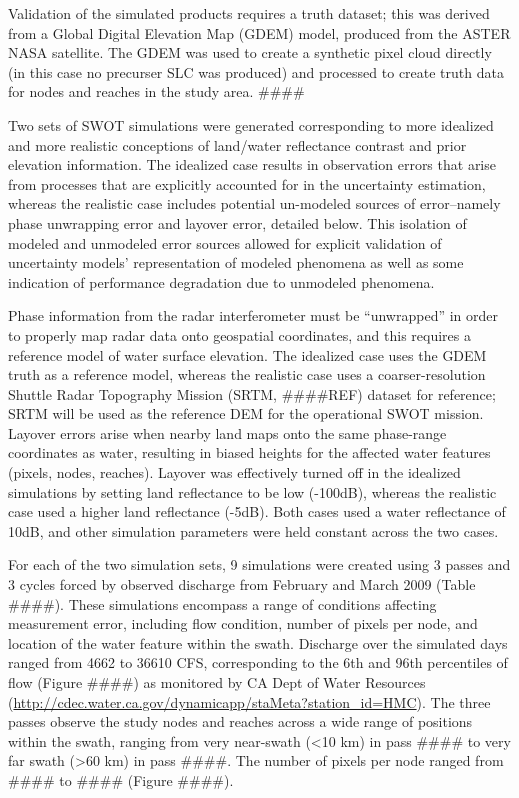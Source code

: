 \documentclass[]{book}
\begin{document}
Validation of the simulated products requires a truth dataset; this was derived from a Global Digital Elevation Map (GDEM) model, produced from the ASTER NASA satellite. The GDEM was used to create a synthetic pixel cloud directly (in this case no precurser SLC was produced) and processed to create truth data for nodes and reaches in the study area. \#\#\#\#

Two sets of SWOT simulations were generated corresponding to more idealized and more realistic conceptions of land/water reflectance contrast and prior elevation information. The idealized case results in observation errors that arise from processes that are explicitly accounted for in the uncertainty estimation, whereas the realistic case includes potential un-modeled sources of error--namely phase unwrapping error and layover error, detailed below. This isolation of modeled and unmodeled error sources allowed for explicit validation of uncertainty models' representation of modeled phenomena as well as some indication of performance degradation due to unmodeled phenomena.

Phase information from the radar interferometer must be ``unwrapped'' in order to properly map radar data onto geospatial coordinates, and this requires a reference model of water surface elevation. The idealized case uses the GDEM truth as a reference model, whereas the realistic case uses a coarser-resolution Shuttle Radar Topography Mission (SRTM, \#\#\#\#REF) dataset for reference; SRTM will be used as the reference DEM for the operational SWOT mission. Layover errors arise when nearby land maps onto the same phase-range coordinates as water, resulting in biased heights for the affected water features (pixels, nodes, reaches). Layover was effectively turned off in the idealized simulations by setting land reflectance to be low (-100dB), whereas the realistic case used a higher land reflectance (-5dB). Both cases used a water reflectance of 10dB, and other simulation parameters were held constant across the two cases.

For each of the two simulation sets, 9 simulations were created using 3 passes and 3 cycles forced by observed discharge from February and March 2009 (Table \#\#\#\#). These simulations encompass a range of conditions affecting measurement error, including flow condition, number of pixels per node, and location of the water feature within the swath. Discharge over the simulated days ranged from 4662 to 36610 CFS, corresponding to the 6th and 96th percentiles of flow (Figure \#\#\#\#) as monitored by CA Dept of Water Resources (\url{http://cdec.water.ca.gov/dynamicapp/staMeta?station_id=HMC}). The three passes observe the study nodes and reaches across a wide range of positions within the swath, ranging from very near-swath (\textless10 km) in pass \#\#\#\# to very far swath (\textgreater60 km) in pass \#\#\#\#. The number of pixels per node ranged from \#\#\#\# to \#\#\#\# (Figure \#\#\#\#).
\end{document}
